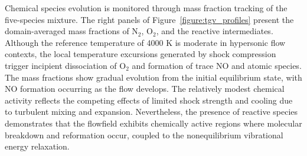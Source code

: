 Chemical species evolution is monitored through mass fraction tracking of the five-species mixture. The right panels of Figure~\ref{figure:tgv_profiles} present the domain-averaged mass fractions of N$_2$, O$_2$, and the reactive intermediates. Although the reference temperature of 4000 K is moderate in hypersonic flow contexts, the local temperature excursions generated by shock compression trigger incipient dissociation of O$_2$ and formation of trace NO and atomic species. The mass fractions show gradual evolution from the initial equilibrium state, with NO formation occurring as the flow develops. The relatively modest chemical activity reflects the competing effects of limited shock strength and cooling due to turbulent mixing and expansion. Nevertheless, the presence of reactive species demonstrates that the flowfield exhibits chemically active regions where molecular breakdown and reformation occur, coupled to the nonequilibrium vibrational energy relaxation.









